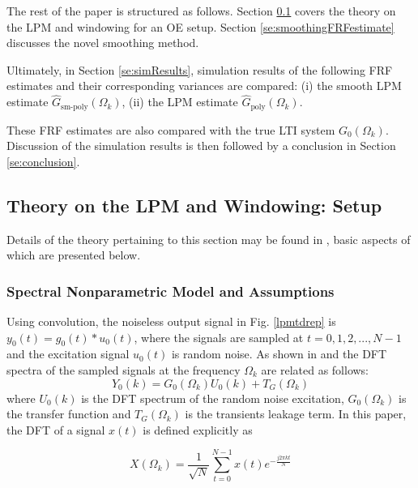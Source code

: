The rest of the paper is structured as follows. Section \ref{se:theoryLPMandWindowing} covers the theory on the LPM and windowing for an OE setup. 
Section \ref{se:smoothingFRFestimate} discusses the novel smoothing method. 



Ultimately, in Section \ref{se:simResults}, simulation results of the following FRF estimates and their corresponding variances are compared: (i) the smooth LPM estimate $\hat{G}_\text{sm-poly}(\Omega_k)$, (ii) the LPM estimate $\hat{G}_\text{poly}(\Omega_k)$. 

These FRF estimates are also compared with the true LTI system ${G}_0(\Omega_k)$. Discussion of the simulation results is then followed by a conclusion in Section \ref{se:conclusion}.

\subsection{Theory on the LPM and Windowing:  Setup}\label{se:theoryLPMandWindowing}


Details of the theory pertaining to this section may be found in \cite{schoukens2010nonparametric}, basic aspects of which are presented below.


\subsubsection{Spectral Nonparametric Model and Assumptions}

Using convolution, the noiseless output signal in Fig. \ref{lpmtdrep} is $y_0(t) = g_0(t)*u_0(t)$, where the signals are sampled at $t = 0, 1, 2,...,N-1$ and the excitation signal $u_0(t)$ is random noise. As shown in \cite{FDidentEd2Pintelon} and \cite{Pintelon1997} the DFT spectra of the sampled signals at the frequency $\Omega_k$ are related as follows:
\begin{equation}\label{lpmleak}
Y_0(k)=G_0(\Omega_k)U_0(k)+T_G(\Omega_k)
\end{equation}
where $U_0(k)$ is the DFT spectrum of the random noise excitation,  $G_0(\Omega_k)$ is the transfer function and $T_G(\Omega_k)$ is the transients leakage term. 
In this paper, the DFT of a signal $x(t)$ is defined explicitly as  \cite{Oppenheim1983}

\begin{equation}\label{eq:defDFT}
X(\Omega_k) = \frac{1}{\sqrt{N}}\sum_{t=0}^{N-1}x(t)e^{-\frac{j2\pi kt}{N}}
\end{equation}


